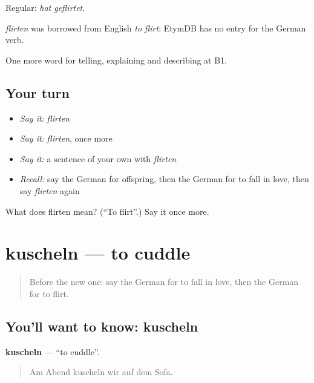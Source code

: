 Regular: \emph{hat geflirtet}.

\begin{cousinweb}
\emph{flirten} was borrowed from English \emph{to flirt}; EtymDB has no entry for the German verb.
\end{cousinweb}

\begin{grammarlens}[title={What you've built}]
One more word for telling, explaining and describing at B1.
\end{grammarlens}

\subsection*{Your turn}
\begin{itemize}
\raggedright
  \item \emph{Say it:} \emph{flirten}
  \item \emph{Say it:} \emph{flirten}, once more
  \item \emph{Say it:} a sentence of your own with \emph{flirten}
  \item \emph{Recall:} say the German for offspring, then the German for to fall in love, then say \emph{flirten} again
\end{itemize}

\begin{tcolorbox}[breakable,colback=teal!4,colframe=teal!35!black,title={Before you move on}]
What does flirten mean? (\textquotedblleft{}To flirt\textquotedblright{}.) Say it once more.
\end{tcolorbox}
\section[kuscheln]{kuscheln — to cuddle}

\label{lesson:GE-C492-kuscheln}



\begin{quote}
Before the new one: say the German for to fall in love, then the German for to flirt.
\end{quote}

\subsection*{You'll want to know: kuscheln}
\textbf{kuscheln} — \textquotedblleft{}to cuddle\textquotedblright{}.

\begin{quote}
Am Abend kuscheln wir auf dem Sofa.
\end{quote}

